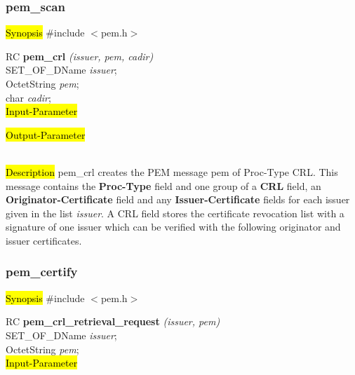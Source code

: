\subsubsection{pem\_scan}
\label{pem_crl}
\hl{Synopsis}
\#include $<$pem.h$>$ 

RC {\bf pem\_crl} {\em (issuer, pem, cadir)} \\
SET\_OF\_DName {\em *issuer}; \\
OctetString {\em *pem}; \\
char {\em *cadir}; \\
\hl{Input-Parameter}


\hl{Output-Parameter}

 \\
\hl{Description}
pem\_crl creates the PEM message pem of Proc-Type CRL.
This message contains the {\bf Proc-Type } field and one group of a {\bf CRL} field,
an {\bf Originator-Certificate} field and any {\bf Issuer-Certificate} fields
for each issuer given in the list {\em issuer}. A CRL field stores the certificate
revocation list with a signature of one issuer which can be verified with the following
originator and issuer certificates.

\subsubsection{pem\_certify}
\label{pem_crl_retrieval_request}
\hl{Synopsis}
\#include $<$pem.h$>$ 

RC {\bf pem\_crl\_retrieval\_request} {\em (issuer, pem)} \\
SET\_OF\_DName {\em *issuer}; \\
OctetString {\em *pem}; \\
\hl{Input-Parameter}

